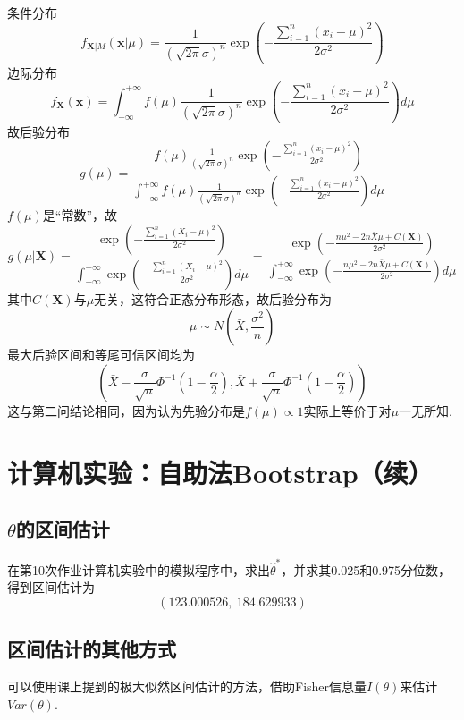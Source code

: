 \documentclass{article}
\begin{document}
\begin{CJK}{UTF8}{gbsn}
\subsection{}
条件分布
$$ f_{\mathbf{X}|M}(\mathbf{x}|\mu)=\frac{1}{(\sqrt{2\pi}\sigma)^{n}}\exp(-\frac{\sum\limits_{i=1}^{n}(x_{i}-\mu)^{2}}{2\sigma^{2}})$$
边际分布
$$ f_{\mathbf{X}}(\mathbf{x})=\int_{-\infty}^{+\infty}f(\mu)\frac{1}{(\sqrt{2\pi}\sigma)^{n}}\exp(-\frac{\sum\limits_{i=1}^{n}(x_{i}-\mu)^{2}}{2\sigma^{2}})d\mu$$
故后验分布
$$ g(\mu)=\frac{f(\mu)\frac{1}{(\sqrt{2\pi}\sigma)^{n}}\exp(-\frac{\sum\limits_{i=1}^{n}(x_{i}-\mu)^{2}}{2\sigma^{2}})}{\int_{-\infty}^{+\infty}f(\mu)\frac{1}{(\sqrt{2\pi}\sigma)^{n}}\exp(-\frac{\sum\limits_{i=1}^{n}(x_{i}-\mu)^{2}}{2\sigma^{2}})d\mu}$$
$f(\mu)$是“常数”，故
$$ g(\mu|\mathbf{X})=\frac{\exp(-\frac{\sum\limits_{i=1}^{n}(X_{i}-\mu)^{2}}{2\sigma^{2}})}{\int_{-\infty}^{+\infty}\exp(-\frac{\sum\limits_{i=1}^{n}(X_{i}-\mu)^{2}}{2\sigma^{2}})d\mu}=\frac{\exp(-\frac{n\mu^{2}-2n\bar{X}\mu+C(\mathbf{X})}{2\sigma^{2}})}{\int_{-\infty}^{+\infty}\exp(-\frac{n\mu^{2}-2n\bar{X}\mu+C(\mathbf{X})}{2\sigma^{2}})d\mu}$$
其中$C(\mathbf{X})$与$\mu$无关，这符合正态分布形态，故后验分布为
$$ \mu\sim N(\bar{X},\frac{\sigma^{2}}{n})$$
最大后验区间和等尾可信区间均为
$$(\bar{X}-\frac{\sigma}{\sqrt{n}}\Phi^{-1}(1-\frac{\alpha}{2}),\bar{X}+\frac{\sigma}{\sqrt{n}}\Phi^{-1}(1-\frac{\alpha}{2}))$$
这与第二问结论相同，因为认为先验分布是$f(\mu)\propto 1$实际上等价于对$\mu$一无所知.
\section{计算机实验：自助法Bootstrap（续）}
\subsection{$\theta$的区间估计}
在第10次作业计算机实验中的模拟程序中，求出$\hat{\theta}^{*}$，并求其0.025和0.975分位数，得到区间估计为
$$ (123.000526,\ 184.629933) $$
\subsection{区间估计的其他方式}
可以使用课上提到的极大似然区间估计的方法，借助Fisher信息量$I(\theta)$来估计$Var(\theta)$.
\end{CJK}
\end{document}
